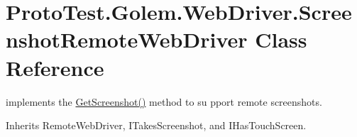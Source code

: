 \hypertarget{class_proto_test_1_1_golem_1_1_web_driver_1_1_screenshot_remote_web_driver}{\section{Proto\-Test.\-Golem.\-Web\-Driver.\-Screenshot\-Remote\-Web\-Driver Class Reference}
\label{class_proto_test_1_1_golem_1_1_web_driver_1_1_screenshot_remote_web_driver}
}


implements the \hyperlink{class_proto_test_1_1_golem_1_1_web_driver_1_1_screenshot_remote_web_driver_a2c67b3a43ba743440a0323ceae10de33}{Get\-Screenshot()} method to su pport remote screenshots.  




Inherits Remote\-Web\-Driver, I\-Takes\-Screenshot, and I\-Has\-Touch\-Screen.


